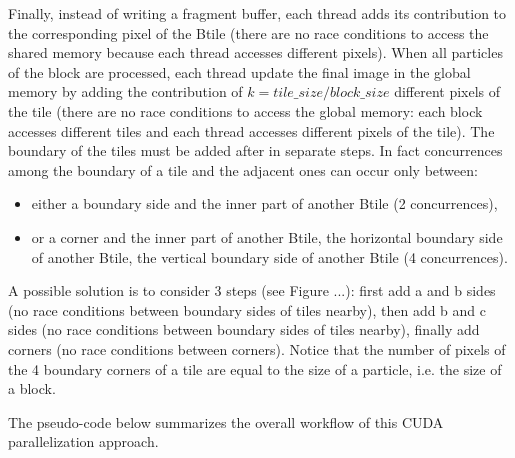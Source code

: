 \documentclass[11pt]{article}
\begin{document}
Finally, instead of writing a fragment buffer, each thread adds its contribution to the corresponding pixel of the Btile (there are no race conditions to access the shared memory because each thread accesses different pixels). 
When all particles of the block are processed, each thread update the final image in the global memory 
by adding the contribution of $k = tile\_size/block\_size$ different pixels of the tile (there are no race conditions to access the global memory: each block accesses different tiles and each thread accesses different pixels of the tile). The boundary of the tiles must be added after in separate steps. In fact concurrences among the boundary of a tile and the adjacent ones can occur only between:
\begin{itemize}
\item
either a boundary side and the inner part of another Btile (2 concurrences), 
\item
or a corner and the inner part of another Btile, the horizontal boundary side of another Btile, the vertical boundary side of another Btile (4 concurrences). 
\end{itemize}
A possible solution is to consider 3 steps (see Figure ...):  
first add a and b sides (no race conditions between boundary sides of tiles nearby),
then add b and c sides (no race conditions between boundary sides of tiles nearby),
finally add corners (no race conditions between corners). Notice that the number of pixels of the 4 boundary corners of a tile are equal to the size of a particle, i.e. the size of a block. 

The pseudo-code below summarizes the overall workflow of this CUDA parallelization approach.
\end{document}
